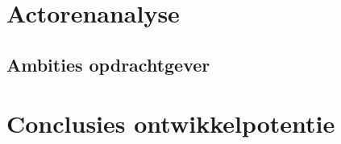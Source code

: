\section{Actorenanalyse}
\subsection{Ambities opdrachtgever}



\section{Conclusies ontwikkelpotentie}


